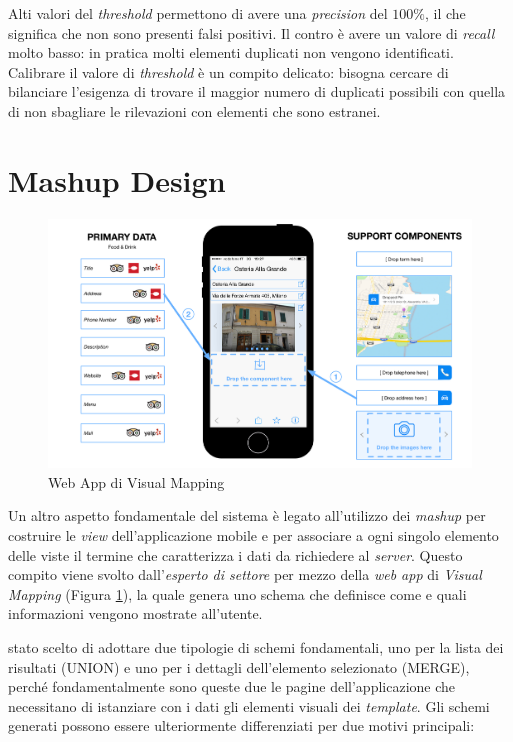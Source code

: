 Alti valori del \emph{threshold} permettono di avere una \emph{precision} del $ 100\% $, il che significa che non sono presenti falsi positivi. Il contro è avere un valore di \emph{recall} molto basso: in pratica molti elementi duplicati non vengono identificati. Calibrare il valore di \emph{threshold} è un compito delicato: bisogna cercare di bilanciare l'esigenza di trovare il maggior numero di duplicati possibili con quella di non sbagliare le rilevazioni con elementi che sono estranei.

\section{Mashup Design\label{sec:mashup-design}}

\begin{figure}[ht]
	\centering
	\includegraphics[width=\textwidth]{3-metodologia-camus/Immagini/visual-mapping-nuovo.png}
	\caption{Web App di Visual Mapping}\label{fig:visual-mapping}
\end{figure}

Un altro aspetto fondamentale del sistema è legato all'utilizzo dei \emph{mashup} per costruire le \emph{view} dell'applicazione mobile e per associare a ogni singolo elemento delle viste il termine che caratterizza i dati da richiedere al \emph{server}. Questo compito viene svolto dall'\emph{esperto di settore} per mezzo della \emph{web app} di \emph{Visual Mapping} (Figura \ref{fig:visual-mapping}), la quale genera uno schema che definisce come e quali informazioni vengono mostrate all'utente.

\upe stato scelto di adottare due tipologie di schemi fondamentali, uno per la lista dei risultati (UNION) e uno per i dettagli dell'elemento selezionato (MERGE), perché fondamentalmente sono queste due le pagine dell'applicazione che necessitano di istanziare con i dati gli elementi visuali dei \emph{template}.
Gli schemi generati possono essere ulteriormente differenziati per due motivi principali:

